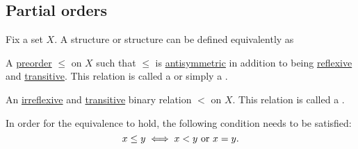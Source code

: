 \subsection{Partial orders}\label{subsec:partial_orders}

\begin{definition}\label{def:poset}
  Fix a set \( X \). A  structure or  structure can be defined equivalently as
  \begin{defenum}
     A \hyperref[def:preordered_set]{preorder} \( \leq \) on \( X \) such that \( \leq \) is \hyperref[def:binary_relation/antisymmetric]{antisymmetric} in addition to being \hyperref[def:binary_relation/reflexive]{reflexive} and \hyperref[def:binary_relation/transitive]{transitive}. This relation is called a  or simply a .

     An \hyperref[def:binary_relation/irreflexive]{irreflexive} and \hyperref[def:binary_relation/transitive]{transitive} binary relation \( < \) on \( X \). This relation is called a .
  \end{defenum}

  In order for the equivalence to hold, the following condition needs to be satisfied:
  \begin{equation*}
    x \leq y \iff x < y \text{ or } x = y.
  \end{equation*}
\end{definition}

